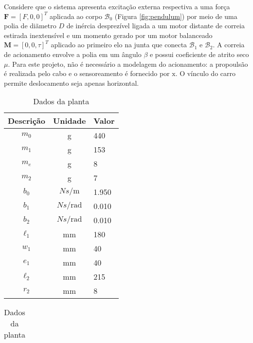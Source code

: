\documentclass[a4paper, twoside]{article}
\begin{document}
    Considere que o sistema apresenta excitação externa respectiva a uma força $\mathbf{F} = [F, 0, 0]^T$ aplicada ao corpo $\mathcal{B}_0$ (Figura \ref{fig:pendulum}) por meio de uma polia de diãmetro $D$ de inércia desprezível ligada a um motor distante de correia estirada inextensível e um momento gerado por um motor balanceado $\mathbf{M} = [0, 0, \tau]^T$ aplicado ao primeiro elo na junta que conecta $\mathcal{B}_1$ e $\mathcal{B}_2$. A correia de acionamento envolve a polia em um ângulo $\beta$ e possui coeficiente de atrito seco $\mu$. Para este projeto, não é necessário a modelagem do acionamento: a propoulsão é realizada pelo cabo e o sensoreamento é fornecido por $\mathrm{x}$. O vínculo do carro permite deslocamento seja apenas horizontal.
    
    \begin{table}[!ht]
        \begin{minipage}[b]{0.45\linewidth}\centering
                \begin{tabular}{|c|c|l|}
                    \hline Descrição & Unidade & Valor\\ \hline
                    $m_0$ & g & 440\\
                    $m_1$ & g & 153\\
                    $m_e$ & g & 8\\
                    $m_2$ & g & 7\\
                    $b_0$   & ${N s}/{\mathrm{m}}$ & 1.950\\
                    $b_1$   & ${N s}/{\mathrm{rad}}$ & 0.010\\
                    $b_2$   & ${N s}/{\mathrm{rad}}$ & 0.010\\
                    $\ell_1$ & mm & 180\\ 
                    $w_1$ & mm & 40\\
                    $e_1$ & mm & 40\\
                    $\ell_2$ & mm  & 215\\
                    $r_2$ & mm & 8\\ 
                    \hline
                \end{tabular}
                \caption{Dados da planta}
                \label{tab:dados_planta}
        \end{minipage}
        \hspace{0.5cm}
        \begin{minipage}[b]{0.45\linewidth}
        \centering
                \begin{tabular}{|c|c|c|}

\end{tabular}
\end{minipage}
\end{table}
\end{document}
